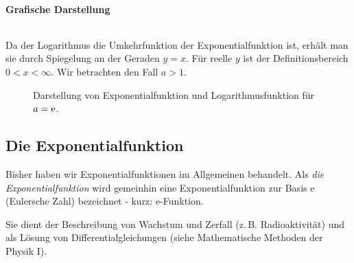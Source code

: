 \newpage
\paragraph{Grafische Darstellung}$~$

Da der Logarithmus die Umkehrfunktion der Exponentialfunktion ist, erhält man sie durch Spiegelung an der Geraden $y=x$. Für reelle $y$ ist der Definitionsbereich $0 < x < \infty$. Wir betrachten den Fall $a > 1$.
\begin{figure}[htp]
    \centering
    \caption{Darstellung von Exponentialfunktion und Logarithmusfunktion für $a = \mathrm{e}$.}
    \label{}
\end{figure}


\subsection{Die Exponentialfunktion}
Bisher haben wir Exponentialfunktionen im Allgemeinen behandelt. Als \emph{die Exponentialfunktion} wird gemeinhin eine Exponentialfunktion zur Basis e (Eulersche Zahl) bezeichnet - kurz: e-Funktion.

Sie dient der Beschreibung von Wachstum und Zerfall (z.\,B. Radioaktivität) und als Lösung von Differentialgleichungen (siehe Mathematische Methoden der Physik I).

